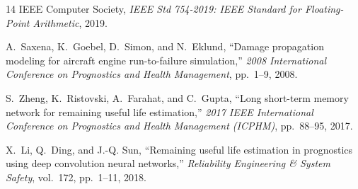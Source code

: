 \documentclass[10pt,twocolumn,a4paper]{article}
\theoremstyle{plain}
\theoremstyle{definition}
\begin{document}
\begin{thebibliography}{14}
IEEE Computer Society, \emph{IEEE Std 754-2019: IEEE Standard for Floating-Point Arithmetic}, 2019.

A.~Saxena, K.~Goebel, D.~Simon, and N.~Eklund, ``Damage propagation modeling for aircraft engine run-to-failure simulation,'' \emph{2008 International Conference on Prognostics and Health Management}, pp.~1--9, 2008.

S.~Zheng, K.~Ristovski, A.~Farahat, and C.~Gupta, ``Long short-term memory network for remaining useful life estimation,'' \emph{2017 IEEE International Conference on Prognostics and Health Management (ICPHM)}, pp.~88--95, 2017.

X.~Li, Q.~Ding, and J.-Q. Sun, ``Remaining useful life estimation in prognostics using deep convolution neural networks,'' \emph{Reliability Engineering \& System Safety}, vol.~172, pp.~1--11, 2018.

\end{thebibliography}
\end{document}
